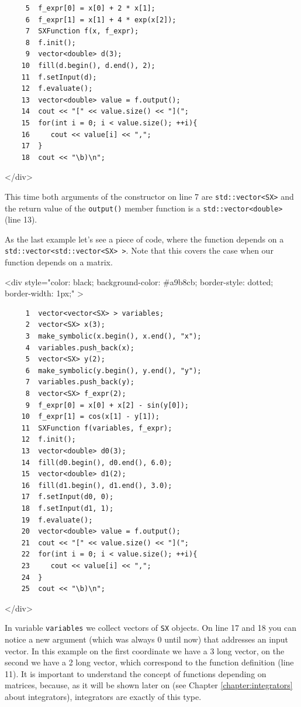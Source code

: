 \documentclass[a4paper,12pt]{book}
\newcommand{\codebegin}{
\begin{rawhtml}
<div style="color: black; background-color: \#a9b8cb;  border-style: dotted; border-width: 1px;" >
\end{rawhtml}
}
\newcommand{\codeend}{
\begin{rawhtml}
</div>
\end{rawhtml}
}
\newcommand{\codebegin}{

}
\newcommand{\codeend}{

}
\begin{document}
{\begin{verbatim}
     5  f_expr[0] = x[0] + 2 * x[1];
     6  f_expr[1] = x[1] + 4 * exp(x[2]);
     7  SXFunction f(x, f_expr);
     8  f.init();
     9  vector<double> d(3);
    10  fill(d.begin(), d.end(), 2);
    11  f.setInput(d);
    12  f.evaluate();
    13  vector<double> value = f.output();
    14  cout << "[" << value.size() << "](";
    15  for(int i = 0; i < value.size(); ++i){
    16     cout << value[i] << ",";
    17  }
    18  cout << "\b)\n";
\end{verbatim}
\codeend
This time both arguments of the constructor on line 7 are \texttt{std::vector<SX>}
 and the return value of the
 \texttt{output()} member function is a \texttt{std::vector<double>} (line 13).
\par\noindent
As the last example let's see a piece of code, where the function depends on a  \texttt{std::vector<std::vector<SX> >}. 
Note that this covers the case when our function depends on a matrix.
\par
\codebegin
\begin{verbatim}
     1  vector<vector<SX> > variables;
     2  vector<SX> x(3);
     3  make_symbolic(x.begin(), x.end(), "x");
     4  variables.push_back(x);
     5  vector<SX> y(2);
     6  make_symbolic(y.begin(), y.end(), "y");
     7  variables.push_back(y);
     8  vector<SX> f_expr(2);
     9  f_expr[0] = x[0] + x[2] - sin(y[0]);
    10  f_expr[1] = cos(x[1] - y[1]);
    11  SXFunction f(variables, f_expr);
    12  f.init();
    13  vector<double> d0(3);
    14  fill(d0.begin(), d0.end(), 6.0);
    15  vector<double> d1(2);
    16  fill(d1.begin(), d1.end(), 3.0);
    17  f.setInput(d0, 0);
    18  f.setInput(d1, 1);
    19  f.evaluate();
    20  vector<double> value = f.output();
    21  cout << "[" << value.size() << "](";
    22  for(int i = 0; i < value.size(); ++i){
    23     cout << value[i] << ",";
    24  }
    25  cout << "\b)\n";
\end{verbatim}
\codeend
In variable \texttt{variables} we collect vectors of \texttt{SX} objects. On line 17 and 18 you can notice
a new argument (which was always 0 until now) that addresses an input vector. In this example on the first coordinate
we have a 3 long vector, on the second we have a 2 long vector, which correspond to the function definition (line 11).
It is important to understand the concept of functions depending on matrices, because, as it will be shown later on (see
Chapter \ref{chapter:integrators} about integrators),
integrators are exactly of this type.
}
\end{document}

